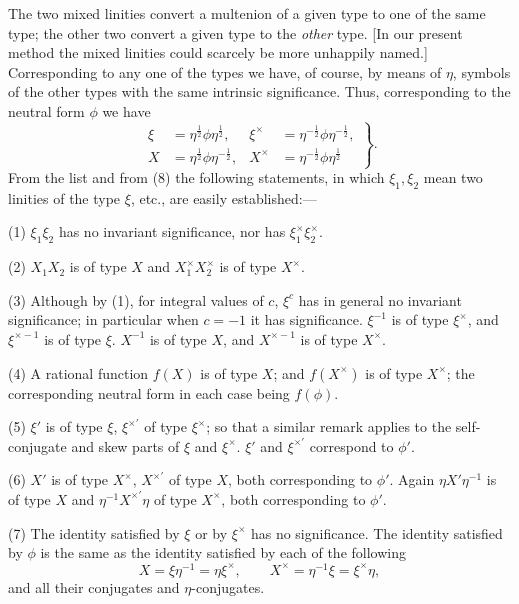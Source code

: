 \documentclass[11pt]{article}
\begin{document}
\indent The two mixed linities convert a multenion of a given type to one of the same type; the other two convert a given type to the \emph{other} type. [In our present method the mixed linities could scarcely be more unhappily named.]
\indent Corresponding to any one of the types we have, of course, by means of $\eta$, symbols of the other types with the same intrinsic significance. Thus, corresponding to the neutral form $\phi$ we have
\begin{equation}\left.\begin{aligned}\xi&=\eta^{\frac12}\phi\eta^{\frac12},&\xi^\times&=\eta^{-\frac12}\phi\eta^{-\frac12},\\X&=\eta^{\frac12}\phi\eta^{-\frac12},&X^\times&=\eta^{-\frac12}\phi\eta^{\frac12}\end{aligned}\right\}.\tag{8}\end{equation}
From the list and from (8) the following statements, in which $\xi_1,\xi_2$ mean two linities of the type $\xi$, etc., are easily established:---
\par\indent (1) $\xi_1\xi_2$ has no invariant significance, nor has $\xi_1^\times\xi_2^\times$.
\par\indent (2) $X_1X_2$ is of type $X$ and $X_1^\times X_2^\times$ is of type $X^\times$.
\par\indent (3) Although by (1), for integral values of $c$, $\xi^c$ has in general no invariant significance; in particular when $c=-1$ it has significance. $\xi^{-1}$ is of type $\xi^\times$, and $\xi^{\times-1}$ is of type $\xi$. $X^{-1}$ is of type $X$, and $X^{\times-1}$ is of type $X^\times$.
\par\indent (4) A rational function $f(X)$ is of type $X$; and $f(X^\times)$ is of type $X^\times$; the corresponding neutral form in each case being $f(\phi)$.
\par\indent (5) $\xi'$ is of type $\xi$, $\xi^{\times\prime}$ of type $\xi^\times$; so that a similar remark applies to the self-conjugate and skew parts of $\xi$ and $\xi^\times$. $\xi'$ and $\xi^{\times\prime}$ correspond to $\phi'$.
\par\indent (6) $X'$ is of type $X^\times$, $X^{\times\prime}$ of type $X$, both corresponding to $\phi'$. Again $\eta X'\eta^{-1}$ is of type $X$ and $\eta^{-1}X^{\times\prime}\eta$ of type $X^\times$, both corresponding to $\phi'$.
\par\indent (7) The identity satisfied by $\xi$ or by $\xi^\times$ has no significance. The
identity satisfied by $\phi$ is the same as the identity satisfied by each of the following
\[
X=\xi\eta^{-1}=\eta\xi^\times,\qquad X^\times=\eta^{-1}\xi=\xi^\times\eta,
\]
and all their conjugates and $\eta$-conjugates.
\end{document}
